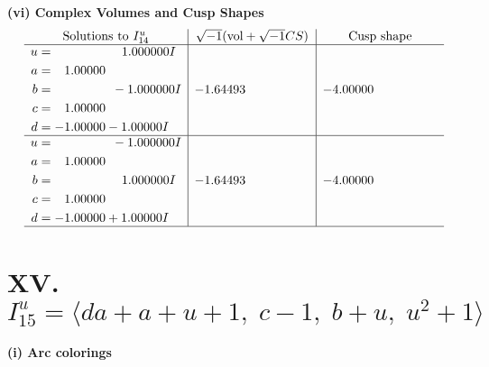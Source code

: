 \documentclass[1p]{elsarticle_modified}
\theoremstyle{definition}
\newcommand{\I}{\sqrt{-1}}
\begin{document}
\newpage\flushleft \textbf{(vi) Complex Volumes and Cusp Shapes}
$$\begin{array}{c|c|c}  
\text{Solutions to }I^u_{14}& \I (\text{vol} + \sqrt{-1}CS) & \text{Cusp shape}\\
 \hline 
\begin{aligned}
u &= \phantom{-0.000000 -}1.000000 I \\
a &= \phantom{-}1.00000\phantom{ +0.000000I} \\
b &= \phantom{-0.000000 } -1.000000 I \\
c &= \phantom{-}1.00000\phantom{ +0.000000I} \\
d &= -1.00000 - 1.00000 I\end{aligned}
 & -1.64493\phantom{ +0.000000I} & -4.00000\phantom{ +0.000000I} \\ \hline\begin{aligned}
u &= \phantom{-0.000000 } -1.000000 I \\
a &= \phantom{-}1.00000\phantom{ +0.000000I} \\
b &= \phantom{-0.000000 -}1.000000 I \\
c &= \phantom{-}1.00000\phantom{ +0.000000I} \\
d &= -1.00000 + 1.00000 I\end{aligned}
 & -1.64493\phantom{ +0.000000I} & -4.00000\phantom{ +0.000000I}\\
 \hline 
 \end{array}$$\newpage\newpage\renewcommand{\arraystretch}{1}
\centering \section*{XV. $I^u_{15}= \langle d a+a+u+1,\;c-1,\;b+u,\;u^2+1 \rangle$}
\flushleft \textbf{(i) Arc colorings}\\
\end{document}
